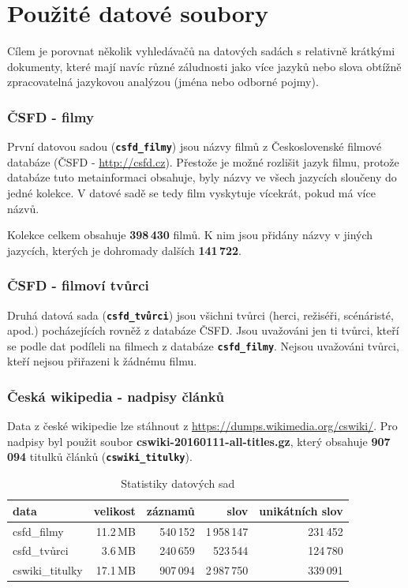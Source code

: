 \documentclass[11pt,letterpaper,oneside,openright]{book}
\newcommand{\bftt}[1]{\texttt{\textbf{#1}}}
\begin{document}
\section{Použité datové soubory}
Cílem je porovnat několik vyhledávačů na datových sadách s relativně krátkými
dokumenty, které mají navíc různé záludnosti jako více jazyků nebo slova
obtížně zpracovatelná jazykovou analýzou (jména nebo odborné pojmy).

\subsubsection{ČSFD - filmy}
První datovou sadou (\bftt{csfd\_filmy}) jsou názvy filmů z Československé
filmové databáze (ČSFD - \url{http://csfd.cz}). Přestože je možné rozlišit jazyk
filmu, protože databáze tuto metainformaci obsahuje, byly názvy ve všech
jazycích sloučeny do jedné kolekce. V datové sadě se tedy film vyskytuje
vícekrát, pokud má více názvů.

Kolekce celkem obsahuje \textbf{398\,430} filmů. K nim jsou přidány názvy v
jiných jazycích, kterých je dohromady dalších \textbf{141\,722}.

\subsubsection{ČSFD - filmoví tvůrci}
Druhá datová sada (\bftt{csfd\_tvůrci}) jsou všichni tvůrci (herci, režiséři,
scénáristé, apod.) pocházejících rovněž z databáze ČSFD. Jsou uvažováni jen ti
tvůrci, kteří se podle dat podíleli na filmech z databáze \bftt{csfd\_filmy}.
Nejsou uvažováni tvůrci, kteří nejsou přiřazeni k žádnému filmu.

\subsubsection{Česká wikipedia - nadpisy článků}
Data z české wikipedie lze stáhnout z
\url{https://dumps.wikimedia.org/cswiki/}. Pro nadpisy byl použit soubor
\textbf{cswiki-20160111-all-titles.gz}, který obsahuje \textbf{907\,094}
titulků článků (\bftt{cswiki\_titulky}).


\mbox{}
\begin{tt}
\begin{table}[H]
\centering
\begin{tabulary}{\textwidth}{LRRRR}
\textbf{data} & \textbf{velikost} & \textbf{záznamů} & \textbf{slov} & \textbf{unikátních slov} \\
\hline
csfd\_filmy     & 11.2\,MB & 540\,152 & 1\,958\,147 & 231\,452 \\
csfd\_tvůrci    & 3.6\,MB  & 240\,659 & 523\,544    & 124\,780 \\
cswiki\_titulky & 17.1\,MB & 907\,094 & 2\,987\,750 & 339\,091 \\
\hline
\end{tabulary}
\caption{Statistiky datových sad}
\label{tab:data_stats}
\end{table}
\end{tt}
\end{document}
